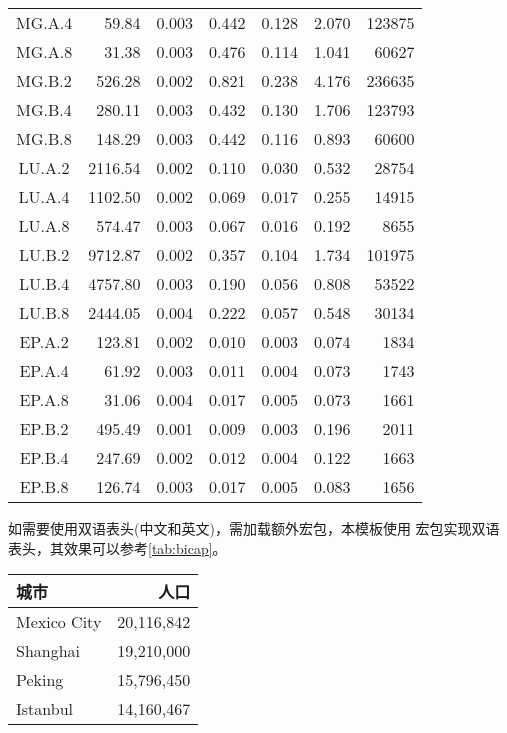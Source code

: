 \begin{longtable}[c]{c*{6}{r}}
        MG.A.4 & 59.84 & 0.003 & 0.442 & 0.128 & 2.070 & 123875 \\
        MG.A.8 & 31.38 & 0.003 & 0.476 & 0.114 & 1.041 & 60627 \\
        MG.B.2 & 526.28 & 0.002 & 0.821 & 0.238 & 4.176 & 236635 \\
        MG.B.4 & 280.11 & 0.003 & 0.432 & 0.130 & 1.706 & 123793 \\
        MG.B.8 & 148.29 & 0.003 & 0.442 & 0.116 & 0.893 & 60600 \\
        LU.A.2 & 2116.54 & 0.002 & 0.110 & 0.030 & 0.532 & 28754 \\
        LU.A.4 & 1102.50 & 0.002 & 0.069 & 0.017 & 0.255 & 14915 \\
        LU.A.8 & 574.47 & 0.003 & 0.067 & 0.016 & 0.192 & 8655 \\
        LU.B.2 & 9712.87 & 0.002 & 0.357 & 0.104 & 1.734 & 101975 \\
        LU.B.4 & 4757.80 & 0.003 & 0.190 & 0.056 & 0.808 & 53522 \\
        LU.B.8 & 2444.05 & 0.004 & 0.222 & 0.057 & 0.548 & 30134 \\
        EP.A.2 & 123.81 & 0.002 & 0.010 & 0.003 & 0.074 & 1834 \\
        EP.A.4 & 61.92 & 0.003 & 0.011 & 0.004 & 0.073 & 1743 \\
        EP.A.8 & 31.06 & 0.004 & 0.017 & 0.005 & 0.073 & 1661 \\
        EP.B.2 & 495.49 & 0.001 & 0.009 & 0.003 & 0.196 & 2011 \\
        EP.B.4 & 247.69 & 0.002 & 0.012 & 0.004 & 0.122 & 1663 \\
        EP.B.8 & 126.74 & 0.003 & 0.017 & 0.005 & 0.083 & 1656 \\
        \bottomrule
   \end{longtable}

   如需要使用双语表头(中文和英文)，需加载额外宏包，本模板使用
宏包实现双语表头，其效果可以参考\autoref{tab:bicap}。

\begin{table}[htb]
  \begin{tabular}{lr}
    \toprule
    城市 & 人口 \\
    \midrule
    Mexico City & 20,116,842\\
    Shanghai & 19,210,000\\
    Peking & 15,796,450\\
    Istanbul & 14,160,467\\
    \bottomrule
  \end{tabular}
\end{table}

